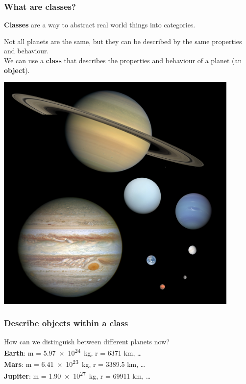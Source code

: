 \documentclass{beamer}
\begin{document}
\begin{frame}
  \frametitle{What are classes?}
  \textbf{Classes} are a way to abstract real world things into categories.\\
  \begin{minipage}[t]{0.55\textwidth}
    \vspace{-3cm}
    Not all planets are the same, but they can be described by the same properties and behaviour.\\
    We can use a \textbf{class} that describes the properties and behaviour of a planet (an \textbf{object}).\\
  \end{minipage}%
  \hspace{5mm}
  \begin{minipage}[t]{0.35\textwidth}
    \centering
    \includegraphics[width=0.9\textwidth]{fig/Planet_collage_to_scale.jpg}
\end{minipage}
\end{frame} 
\begin{frame}
  \frametitle{Describe objects within a class}
  How can we distinguish between different planets now?\\
  \vspace{5mm}
  \textbf{Earth}: m = \SI{5.97e24}{kg}, r = 6371 km, \dots\\
  \vspace{5mm}
  \textbf{Mars}: m = \SI{6.41e23}{kg}, r = 3389.5 km, \dots\\
  \vspace{5mm}
  \textbf{Jupiter}: m = \SI{1.90e27}{kg}, r = 69911 km, \dots\\
\end{frame}
\end{document}
